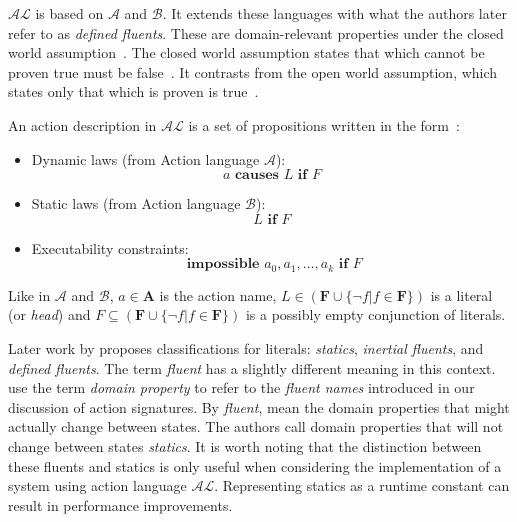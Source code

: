 $ \mathcal{AL} $ is based on $ \mathcal{A} $ and $ \mathcal{B} $.
It extends these languages with what the authors later refer to as \textit{defined fluents}.
These are domain-relevant properties under the closed world assumption~\citep{blount_architecture_2013}.
The closed world assumption states that which cannot be proven true must be false~\citep{reiter_closed_1981}.
It contrasts from the open world assumption, which states only that which is proven is true~\citep{reiter_closed_1981}.

An action description in $ \mathcal{AL} $ is a set of propositions written in the form~\citep{baral_reasoning_2000, blount_architecture_2013}:

\begin{itemize}
    \item Dynamic laws (from Action language $ \mathcal{A} $):
        \begin{equation}
            a \textbf{ causes } L \textbf{ if } F
        \end{equation}

    \item Static laws (from Action language $ \mathcal{B} $):
        \begin{equation}
            L \textbf{ if } F
        \end{equation}

    \item Executability constraints:
        \begin{equation}
            \textbf{ impossible } a_0, a_1, \dots, a_k \textbf{ if } F
        \end{equation}
\end{itemize}

Like in $\mathcal{A}$ and $\mathcal{B}$, $a \in \boldsymbol{A}$ is the action name, $L \in(\boldsymbol{F} \cup\{\neg f | f \in \boldsymbol{F}\}) $ is a literal (or \textit{head}) and $F \subseteq(\boldsymbol{F} \cup\{\neg f | f \in \boldsymbol{F}\})$ is a possibly empty conjunction of literals.

Later work by \citet{gelfond_knowledge_2014} proposes classifications for literals: \textit{statics}, \textit{inertial fluents}, and \textit{defined fluents}.
The term \textit{fluent} has a slightly different meaning in this context.
\citet{gelfond_knowledge_2014} use the term \textit{domain property} to refer to the \textit{fluent names} introduced in our discussion of action signatures.
By \textit{fluent}, \citet{gelfond_knowledge_2014} mean the domain properties that might actually change between states.
The authors call domain properties that will not change between states \textit{statics}.
It is worth noting that the distinction between these fluents and statics is only useful when considering the implementation of a system using action language $\mathcal{AL}$.
Representing statics as a runtime constant can result in performance improvements.


